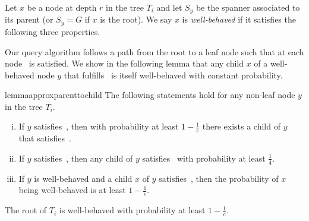 \documentclass{article}\usepackage[a4paper,margin=20mm]{geometry}
\begin{document}
Let $x$ be a node at depth $r$ in the tree $T_i$ and let $S_y$ be the spanner associated to its parent
(or $S_y = G$ if $x$ is the root).
We say $x$ is \emph{well-behaved} if it satisfies the following three properties.

Our query algorithm follows a path from the root to a leaf node
such that at each node~ is satisfied. 
We show in the following lemma that any child $x$ of a well-behaved node $y$
that fulfills~ is itself well-behaved with constant probability.


\begin{restatable}{lemma}{approxparenttochild}
\label{lemma:approx_parent_to_child}
  The following statements hold for any non-leaf node $y$ in the tree $T_i$.
  \begin{enumerate}[(i)]
    \item If $y$ satisfies~, then
      with probability at least $1-\frac{1}{e}$ there exists a child of $y$ 
      that satisfies~.
    \item If $y$ satisfies~, then any child of $y$
      satisfies~ with probability at least $\frac{1}{4}$.
    \item If $y$ is well-behaved
      and a child $x$ of $y$ satisfies~, 
      then the probability of $x$ being well-behaved is at least $1-\frac{1}{e}$.
  \end{enumerate}
  The root of $T_i$ is well-behaved with probability at least $1-\frac{1}{e}$.
\end{restatable}
\end{document}
